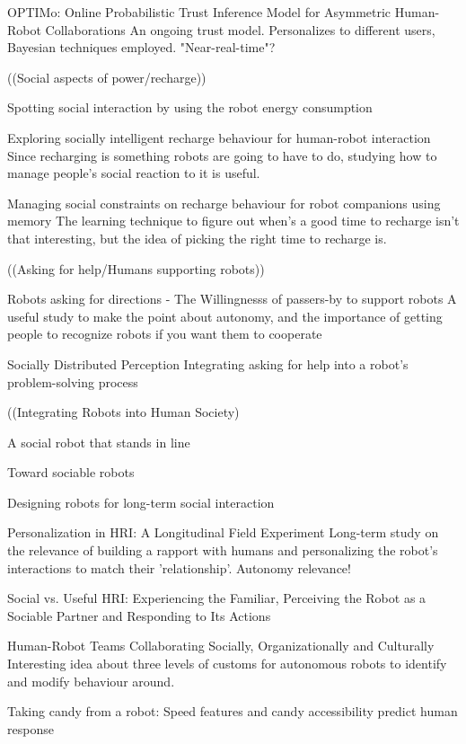 \documentclass{sfuthesis}
\begin{document}
OPTIMo: Online Probabilistic Trust Inference Model for Asymmetric Human-Robot Collaborations	An ongoing trust model. Personalizes to different users, Bayesian techniques employed. "Near-real-time"?

((Social aspects of power/recharge))

Spotting social interaction by using the robot energy consumption

Exploring socially intelligent recharge behaviour for human-robot interaction	Since recharging is something robots are going to have to do, studying how to manage people's social reaction to it is useful.

Managing social constraints on recharge behaviour for robot companions using memory	The learning technique to figure out when's a good time to recharge isn't that interesting, but the idea of picking the right time to recharge is.

((Asking for help/Humans supporting robots))

Robots asking for directions - The Willingnesss of passers-by to support robots	A useful study to make the point about autonomy, and the importance of getting people to recognize robots if you want them to cooperate

Socially Distributed Perception	Integrating asking for help into a robot's problem-solving process

((Integrating Robots into Human Society)

A social robot that stands in line

Toward sociable robots

Designing robots for long-term social interaction

Personalization in HRI: A Longitudinal Field Experiment	Long-term study on the relevance of building a rapport with humans and personalizing the robot's interactions to match their 'relationship'. Autonomy relevance!

Social vs. Useful HRI: Experiencing the Familiar, Perceiving the Robot as a Sociable Partner and Responding to Its Actions







Human-Robot Teams Collaborating Socially, Organizationally and Culturally	Interesting idea about three levels of customs for autonomous robots to identify and modify behaviour around.	

Taking candy from a robot: Speed features and candy accessibility predict human response
\end{document}
